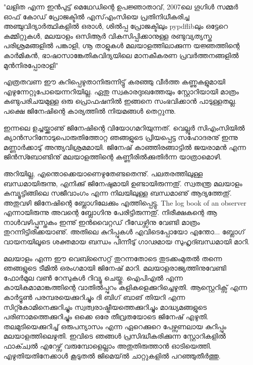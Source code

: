 {\vskip 2pt}

\begin{framed}
"ലളിത എന്ന ഇന്‍പുട്ട് മെഥേഡിന്റെ ഉപജ്ഞാതാവ്, 2007ലെ ഗൂഗിള്‍ സമ്മര്‍ ഓഫ് കോഡ് പ്രോജക്ടില്‍ എസ്എംസിയെ 
പ്രതിനിധീകരിച്ച അഞ്ചുവിദ്യാര്‍ത്ഥികളില്‍ ഒരാള്‍, ശില്‍പ്പ പ്രോജക്ടിലും pypdflibലും ഒട്ടേറെ കമ്മിറ്റുകള്‍, മലയാളം ഒസിആര്‍ 
വികസിപ്പിക്കാനുള്ള രണ്ടുവ്യത്യസ്ത പരിശ്രമങ്ങളില്‍ പങ്കാളി, ഗ്നൂ താളുകള്‍ മലയാളത്തിലാക്കുന്ന യജ്ഞത്തിന്റെ കാര്‍മികന്‍, 
ഭാഷാസാങ്കേതികവിദ്യയിലെ മാനകീകരണ പ്രവര്‍ത്തനങ്ങളില്‍ മുന്‍നിരപ്പോരാളി"
\end{framed}

{\vskip 12pt}

എത്രതവണ ഈ കുറിപ്പെഴുതാനിരുന്നിട്ടു് കരഞ്ഞു വീര്‍ത്ത കണ്ണുകളുമായി എഴുന്നേറ്റുപോയെന്നറിയില്ല. ഏതു സ്വകാരദുഃഖത്തേയും
സ്റ്റോറിയായി മാത്രം കണ്ടുപരിചയമുള്ള ഒരു പ്രൊഫഷനില്‍ ഇങ്ങനെ സംഭവിക്കാന്‍ പാടുള്ളതല്ല. പക്ഷെ ജിനേഷിന്റെ കാര്യത്തില്‍ നിയമങ്ങള്‍ തെറ്റുന്നു.

ഇന്നലെ ഉച്ചയ്ക്കാണു് ജിനേഷിന്റെ വിയോഗമറിയുന്നത്. വെല്ലൂര്‍ സിഎംസിയില്‍ ക്യാന്‍സറിനോടുപൊരുതിത്തോറ്റ ഞങ്ങളുടെ 
പ്രിയപ്പെട്ട സഹോദരനു് ഇന്നു മണ്ണാര്‍ക്കാടു് അന്ത്യവിശ്രമമായി. ജിനേഷ് കാഞ്ഞിരങ്ങാട്ടില്‍ ജയരാമന്‍ എന്ന ജിന്‍സ്ബോണ്ടിനു്
മലയാളത്തിന്റെ കണ്ണീരില്‍ക്കുതിര്‍ന്ന യാത്രാമൊഴി.

അറിയില്ല, എന്തൊക്കെയാണെഴുതേണ്ടതെന്നു്. പലതരത്തിലുള്ള ബന്ധമായിരുന്നു, എനിക്കു് ജിനേഷുമായി ഉണ്ടായിരുന്നതു്. 
സ്വതന്ത്ര മലയാളം കമ്പ്യൂട്ടിങ്ങിലെ സജീവാംഗം എന്ന നിലയിലുള്ള ബന്ധമാണു് ആദ്യത്തേതു്. അതുവഴി ജിനേഷിന്റെ 
ബ്ലോഗിലേക്കും എത്തിപ്പെട്ടു. The log book of an observer എന്നായിരുന്നു അവന്റെ ബ്ലോഗിനു പേരിട്ടിരുന്നതു്. നിരീക്ഷകന്റെ 
ആ നാള്‍വഴിപ്പുസ്തകം ഇന്നു് ഇന്‍വൈറ്റഡ് റീഡേഴ്സിനു വേണ്ടി മാത്രം തുറന്നിട്ടിരിക്കയാണു്. അതിലെ കുറിപ്പുകള്‍ 
എവിടെപ്പോയോ എന്തോ... ബ്ലോഗ് വായനയിലൂടെ ശക്തമായ ബന്ധം പിന്നീടു് ഗാഢമായ സുഹൃദ്ബന്ധമായി മാറി.

മലയാളം എന്ന ഈ വെബ്സൈറ്റ് തുറന്നതോടെ തുടക്കംമുതല്‍ തന്നെ ഞങ്ങളുടെ ടീമില്‍ ഒരംഗമായി ജിനേഷ് മാറി. 
മലയാളരാജ്യത്തിനുവേണ്ടി ഫോര്‍മുല വണ്‍ റേസുകള്‍ റിവ്യൂ ചെയ്തു. ഐപിഎല്‍ എന്ന കായികമാമാങ്കത്തിന്റെ വാതില്‍പ്പുറം 
കളികളെക്കുറിച്ചെഴുതി. ആസ്റ്റെറിക്സ് എന്ന കാര്‍ട്ടൂണ്‍ പരമ്പരയെക്കുറിച്ചും ദി ബിഗ് ബാങ് തിയറി എന്ന സിറ്റ്കോമിനെക്കുറിച്ചും 
സ്വത്വരാഷ്ട്രീയത്തെക്കുറിച്ചും മാദ്ധ്യമങ്ങളുടെ പരിണാമത്തെക്കുറിച്ചും ഒക്കെ ഒരേ തീവ്രതയോടെ ജിനേഷ് എഴുതി. തലമുടിയെക്കുറിച്ച് 
ഒരുപന്യാസം എന്ന ഏറെക്കുറെ പേഴ്സണലായ കുറിപ്പും മലയാളത്തിലെഴുതി. ഇവിടെ ഞങ്ങള്‍ പ്രസിദ്ധീകരിക്കുന്ന സ്റ്റോറികളില്‍ 
ഫാക്ച്വല്‍ എറേഴ്സ് വരുമ്പോളെല്ലാം അതുതിരുത്താന്‍ ഓടിയെത്തി. എഴുതിയതിനേക്കാള്‍ കൂടുതല്‍ ജിമെയ്ല്‍ ചാറ്റുകളില്‍ 
പറഞ്ഞുതീര്‍ത്തു.

